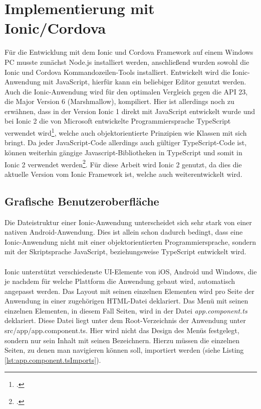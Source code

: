 \section{Implementierung mit Ionic/Cordova}

Für die Entwicklung mit dem Ionic und Cordova Framework auf einem Windows PC musste zunächst Node.js installiert werden, anschließend wurden sowohl die Ionic und Cordova Kommandozeilen-Tools installiert. Entwickelt wird die Ionic-Anwendung mit JavaScript, hierfür kann ein beliebiger Editor genutzt werden. Auch die Ionic-Anwendung wird für den optimalen Vergleich gegen die API 23, die Major Version 6 (Marshmallow), kompiliert. Hier ist allerdings noch zu erwähnen, dass in der Version Ionic 1 direkt mit JavaScript entwickelt wurde und bei Ionic 2 die von Microsoft entwickelte Programmiersprache TypeScript verwendet wird\footcite{Ionic}, welche auch objektorientierte Prinzipien wie Klassen mit sich bringt. Da jeder JavaScript-Code allerdings auch gültiger TypeScript-Code ist, können weiterhin gängige Javascript-Bibliotheken in TypeScript und somit in Ionic 2 verwendet werden\footcite{TypeScript}. Für diese Arbeit wird Ionic 2 genutzt, da dies die aktuelle Version vom Ionic Framework ist, welche auch weiterentwickelt wird.

\subsection*{Grafische Benutzeroberfläche}

Die Dateistruktur einer Ionic-Anwendung unterscheidet sich sehr stark von einer nativen Android-Anwendung. Dies ist allein schon dadurch bedingt, dass eine Ionic-Anwendung nicht mit einer objektorientierten Programmiersprache, sondern mit der Skriptsprache JavaScript, beziehungsweise TypeScript entwickelt wird.     
\\
\\
Ionic unterstützt verschiedenste UI-Elemente von iOS, Android und Windows, die je nachdem für welche Plattform die Anwendung gebaut wird, automatisch angepasst werden. Das Layout mit seinen einzelnen Elementen wird pro Seite der Anwendung in einer zugehörigen HTML-Datei deklariert. Das Menü mit seinen einzelnen Elementen, in diesem Fall Seiten, wird in der Datei \textit{app.component.ts} deklariert. Diese Datei liegt unter dem Root-Verzeichnis der Anwendung unter src/app/app.component.ts. Hier wird nicht das Design des Menüs festgelegt, sondern nur sein Inhalt mit seinen Bezeichnern. Hierzu müssen die einzelnen Seiten, zu denen man navigieren können soll, importiert werden (siehe Listing \ref{lst:app.component.tsImports}). 

